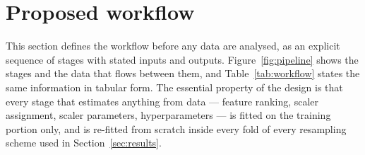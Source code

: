 \documentclass[pdflatex,sn-mathphys-num]{sn-jnl}
\begin{document}
\section{Proposed workflow}\label{sec:workflow}

This section defines the workflow before any data are analysed, as an explicit sequence of stages with stated inputs and outputs. Figure~\ref{fig:pipeline} shows the stages and the data that flows between them, and Table~\ref{tab:workflow} states the same information in tabular form. The essential property of the design is that every stage that estimates anything from data --- feature ranking, scaler assignment, scaler parameters, hyperparameters --- is fitted on the training portion only, and is re-fitted from scratch inside every fold of every resampling scheme used in Section~\ref{sec:results}.
\end{document}
